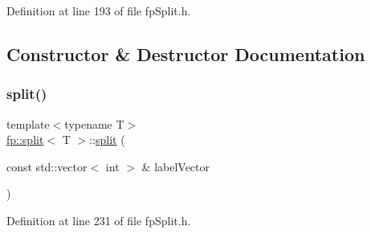 Definition at line 193 of file fp\+Split.\+h.



\subsection{Constructor \& Destructor Documentation}
\mbox{\label{classfp_1_1split_aa47c5cf1e4d7c99506b659df7ab75e14}} 
\subsubsection{\texorpdfstring{split()}{split()}}
{\footnotesize\ttfamily template$<$typename T$>$ \\
\hyperlink{classfp_1_1split}{fp\+::split}$<$ T $>$\+::\hyperlink{classfp_1_1split}{split} (\begin{DoxyParamCaption}\item[{const std\+::vector$<$ int $>$ \&}]{label\+Vector }\end{DoxyParamCaption})\hspace{0.3cm}{\ttfamily [inline]}}



Definition at line 231 of file fp\+Split.\+h.


